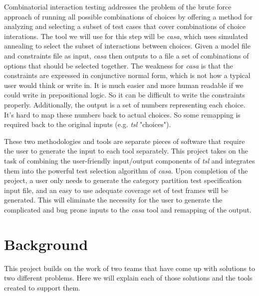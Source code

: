 \documentclass[a4full,12pt]{article}
\begin{document}
Combinatorial interaction testing addresses the problem of the brute force approach of running all
  possible combinations of choices by offering a method for analyzing and selecting a subset of test cases
  that cover combinations of choice interations. The tool we will use for this step will be \emph{casa},
  which uses simulated annealing to select the subset of interactions between choices. Given a model file and
  constraints file as input, \emph{casa} then outputs to a file a set of combinations of options that should
  be selected together. The weakness for \emph{casa} is that the constraints are expressed in conjunctive
  normal form, which is not how a typical user would think or write in. It is much easier and more human
  readable if we could write in prepositional logic. So it can be difficult to write the constraints properly.
  Additionally, the output is a set of numbers representing each choice. It's hard to map these numbers back
  to actual choices. So some remapping is required back to the original inputs (e.g. \emph{tsl} "choices").
 
These two methodologies and tools are separate pieces of software that require the user to generate the input
  to each tool separately. This project takes on the task of combining the user-friendly input/output components
  of \emph{tsl} and integrates them into the powerful test selection algorithm of \emph{casa}. Upon completion of
  the project, a user only needs to generate the category partition test specification input file, and an
  easy to use adequate coverage set of test frames will be generated. This will eliminate the necessity for the
  user to generate the complicated and bug prone inputs to the \emph{casa} tool and remapping of the output.
  
\section{Background}
This project builds on the work of two teams that have come up with solutions to
  two different problems. Here we will explain each of those solutions and the 
  tools created to support them.
\end{document}
